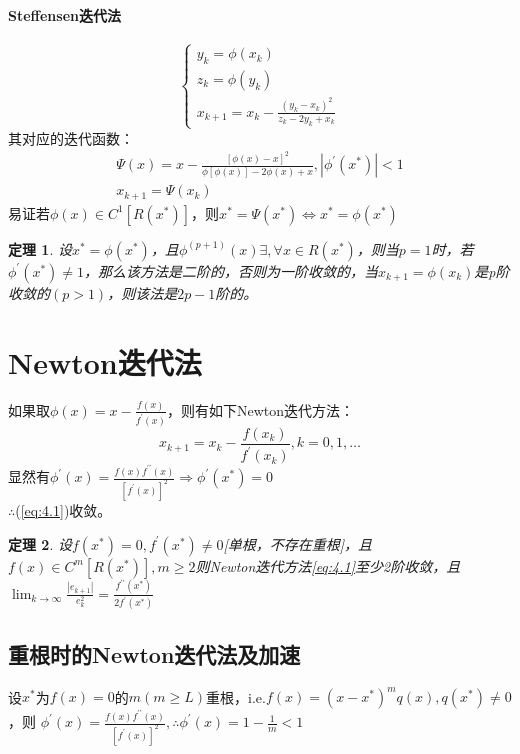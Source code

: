 \documentclass[a4paper]{article}
\newtheorem{theorem}{定理}[section]
\begin{document}
\paragraph{Steffensen迭代法}
\begin{equation*}
    \left\{
        \begin{array}{lr}
            y_k=\phi(x_k)\\
            z_k=\phi(y_k)\\
            x_{k+1}=x_k-\frac{(y_k-x_k)^2}{z_k-2y_k+x_k}
        \end{array}
        \right.
\end{equation*}
其对应的迭代函数：
\begin{equation*}
    \begin{array}{lr}
        \Psi(x)=x-\frac{[\phi(x)-x]^2}{\phi[\phi(x)]-2\phi(x)+x}, |\phi^{'}(x^*)|<1 \\
        x_{k+1}=\Psi(x_k)
    \end{array}
\end{equation*}
易证若$\phi(x)\in C^1[R(x^*)]$，则$x^*=\Psi(x^*)\Leftrightarrow x^*=\phi(x^*) $

\begin{theorem}
    设$x^*=\phi(x^*)$，且$\phi^{(p+1)}(x)\exists, \forall x\in R(x^*) $，则当$p=1$时，若$\phi^{'}(x^*)\neq 1 $，那么该方法是二阶的，否则为一阶收敛的，当$x_{k+1}=\phi(x_k)$是p阶收敛的$(p>1)$，则该法是$2p-1$阶的。
\end{theorem}

\section{Newton迭代法}
如果取$\phi(x)=x-\frac{f(x)}{f^{'}(x)}$，则有如下Newton迭代方法：
\begin{equation}
    x_{k+1}=x_k-\frac{f(x_k)}{f^{'}(x_k)},k=0,1,\dots
    \label{eq:4.1}
\end{equation}
显然有$\phi^{'}(x)=\frac{f(x)f^{{'}{'}}(x)}{[f^{'}(x)]^2}\Rightarrow \phi^{'}(x^*)=0$\\
$\therefore $(\ref{eq:4.1})收敛。

\begin{theorem}
    设$f(x^*)=0,f^{'}(x^*)\neq 0 $[单根，不存在重根]，且$f(x)\in C^m[R(x^*)], m\ge 2$则Newton迭代方法\ref{eq:4.1}至少2阶收敛，且$\lim_{k\rightarrow \infty}\frac{|e_{k+1}|}{e_k^2}=\frac{f^{{'}{'}}(x^*)}{2f^{'}(x^*)}$
\end{theorem}

\subsection{重根时的Newton迭代法及加速}
设$x^*$为$f(x)=0$的$m(m\ge L)$重根，i.e.$f(x)=(x-x^*)^mq(x),q(x^*)\neq 0 $，则
$\phi^{'}(x)=\frac{f(x)f^{{'}{'}}(x)}{[f^{'}(x)]^2}, \therefore  \phi^{'}(x) =1-\frac{1}{m}<1$
\end{document}
